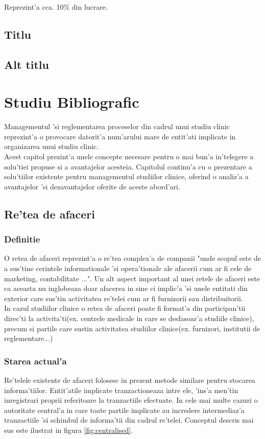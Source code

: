 \documentclass[12pt,a4paper,twoside]{report}
\begin{document}
Reprezint'a cca. 10\% din lucrare.
\section{Titlu}
\section{Alt titlu}


\chapter{Studiu Bibliografic}

	Managementul 'si reglementarea proceselor din cadrul unui studiu clinic reprezint'a o provocare datorit'a num'arului mare de entit'ati implicate in organizarea unui studiu clinic. \\
	Acest capitol prezint'a unele concepte necesare pentru o mai bun'a in'telegere a solu'tiei propuse si a avantajelor acesteia. Capitolul continu'a cu o prezentare a solu'tiilor existente pentru managementul studiilor clinice, oferind o analiz'a a avantajelor 'si dezavantajelor oferite de aceste abord'ari.

\section{Re'tea de afaceri}
\subsection{Definitie}
	O retea de afaceri reprezint'a o re'tea complex'a de companii "unde scopul este de a sus'tine cerintele informationale 'si opera'tionale ale afacerii cum ar fi cele de marketing, contabilitate ..."\cite{bndef}. Un alt aspect important al unei retele de afaceri este ca aceasta nu inglobeaza doar afacerea in sine ci implic'a 'si unele entitati din exterior care sus'tin activitatea re'telei cum ar fi furnizorii sau distribuitorii. \\
	In cazul studiilor clinice o retea de afaceri poate fi format'a din participan'tii direc'ti la activita'ti(ex. centrele medicale in care se desfasoar'a studiile clinice), precum si partile care sustin activitatea studiilor clinice(ex. furnizori, institutii de reglementare...)
\subsection{Starea actual'a}
	Re'telele existente de afaceri folosesc in prezent metode similare pentru stocarea informa'tiilor. Entit'atile implicate tranzactioneaza intre ele, 'ins'a men'tin inregistrari proprii referitoare la tranzactiile efectuate. In cele mai multe cazuri o autoritate central'a in care toate partile implicate au incredere intermediaz'a tranzactiile 'si schimbul de informa'tii din cadrul re'telei. Conceptul descris mai sus este ilustrat in figura \ref{fig:centralised}.\\
	
\end{document}
